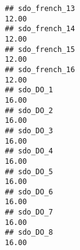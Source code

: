 \documentclass[
]{article}
\begin{document}
\begin{verbatim}
## sdo_french_13                                                                                                                                                                                                                 12.00
## sdo_french_14                                                                                                                                                                                                                 12.00
## sdo_french_15                                                                                                                                                                                                                 12.00
## sdo_french_16                                                                                                                                                                                                                 12.00
## sdo_DO_1                                                                                                                                                                                                                      16.00
## sdo_DO_2                                                                                                                                                                                                                      16.00
## sdo_DO_3                                                                                                                                                                                                                      16.00
## sdo_DO_4                                                                                                                                                                                                                      16.00
## sdo_DO_5                                                                                                                                                                                                                      16.00
## sdo_DO_6                                                                                                                                                                                                                      16.00
## sdo_DO_7                                                                                                                                                                                                                      16.00
## sdo_DO_8                                                                                                                                                                                                                      16.00

\end{verbatim}
\end{document}
